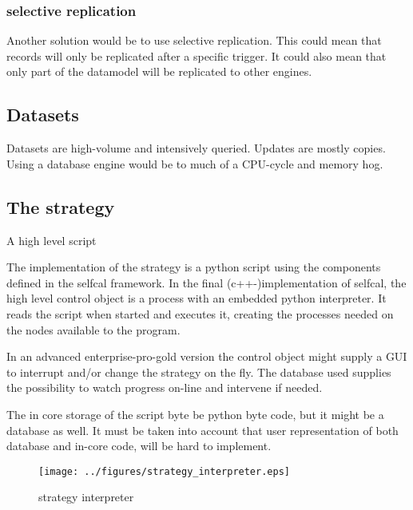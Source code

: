\documentclass[]{lofar}
\begin{document}
      \subsubsection{selective replication}
      \label{id2719816}\hypertarget{id2719816}{}%

        Another solution would be to use selective replication. This
        could mean that records will only be replicated after a
        specific trigger. It could also mean that only part of the
        datamodel will be replicated to other engines.

    \subsection{Datasets}
    \label{id2720237}\hypertarget{id2720237}{}%

      Datasets are high-volume and intensively queried. Updates are
      mostly copies. Using a database engine would be to much of a
      CPU-cycle and memory hog.

    \subsection{The strategy}{A high level script}
    \label{id2721184}\hypertarget{id2721184}{}%

      The implementation of the strategy is a python script using the
      components defined in the selfcal framework. In the final
      (c++-)implementation of selfcal, the high level control object
      is a process with an embedded python interpreter. It reads the
      script when started and executes it, creating the processes
      needed on the nodes available to the program.

      In an advanced enterprise-pro-gold version the control object
      might supply a GUI to interrupt and/or change the strategy on
      the fly. The database used supplies the possibility to watch
      progress on-line and intervene if needed.

      The in core storage of the script byte be python byte code, but
      it might be a database as well. It must be taken into account
      that user representation of both database and in-core code, will
      be hard to implement.

      \begin{figure}
        \texttt{[image: ../figures/strategy\_interpreter.eps]}
        \hypertarget{figure-strategy_interpreter}{}
        \caption{strategy interpreter\label{figure-strategy_interpreter}}
      \end{figure}
\end{document}
